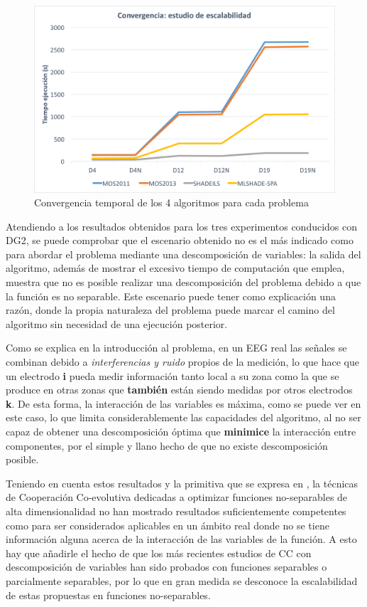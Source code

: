 \begin{figure}[h]
	\centering
	\includegraphics[scale=0.52]{imagenes/ConvergenciaEscalabilidad}
	\caption{Convergencia temporal de los 4 algoritmos para cada problema}
\end{figure}\label{fig:ConvergenciaEscalabilidad}


Atendiendo a los resultados obtenidos para los tres experimentos conducidos con DG2, se puede comprobar que el escenario obtenido no es el más indicado como para abordar el problema mediante una descomposición de variables: la salida del algoritmo, además de mostrar el excesivo tiempo de computación que emplea, muestra que no es posible realizar una descomposición del problema debido a que la función es no separable. Este escenario puede tener como explicación una razón, donde la propia naturaleza del problema puede marcar el camino del algoritmo sin necesidad de una ejecución posterior.

Como se explica en la introducción al problema, en un EEG real las señales se combinan debido a \textit{interferencias y ruido} propios de la medición, lo que hace que un electrodo \textbf{i} pueda medir información tanto local a su zona como la que se produce en otras zonas que \textbf{también} están siendo medidas por otros electrodos \textbf{k}. De esta forma, la interacción de las variables es máxima, como se puede ver en este caso, lo que limita considerablemente las capacidades del algoritmo, al no ser capaz de obtener una descomposición óptima que \textbf{minimice} la interacción entre componentes, por el simple y llano hecho de que no existe descomposición posible.

Teniendo en cuenta estos resultados y la primitiva que se expresa en \cite{DG}, la técnicas de Cooperación Co-evolutiva dedicadas a optimizar funciones no-separables de alta dimensionalidad no han mostrado resultados suficientemente competentes como para ser considerados aplicables en un ámbito real donde no se tiene información alguna acerca de la interacción de las variables de la función. A esto hay que añadirle el hecho de que los más recientes estudios de CC con descomposición de variables han sido probados con funciones separables o parcialmente separables, por lo que en gran medida se desconoce la escalabilidad de estas propuestas en funciones no-separables\cite{DG}.

